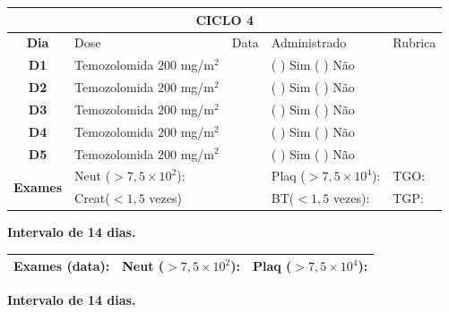 \documentclass[11pt,a4paper,oldfontcommands]{memoir}
\begin{document}
\begin{center}
\begin{longtable}{p{1cm}p{4cm}|p{1cm}|p{4.6cm}|p{3cm}}
	\hline
	\multicolumn{5}{c}{\textbf{CICLO 4}}\\
\hline
    \multicolumn{1}{c|}{\multirow{1}{*}{\textbf{Dia}}}&{Dose}&{Data}&{Administrado}&{Rubrica} \\
    \hline
    \multicolumn{1}{c|}{\multirow{1}{*}{\textbf{D1}}}&{Temozolomida \(200\) mg/m\(^2\)}&&{(  ) Sim (  ) Não}&\\
    \multicolumn{1}{c|}{\multirow{1}{*}{\textbf{D2}}}&{Temozolomida \(200\) mg/m\(^2\)}&&{(  ) Sim (  ) Não}&\\
    \multicolumn{1}{c|}{\multirow{1}{*}{\textbf{D3}}}&{Temozolomida \(200\) mg/m\(^2\)}&&{(  ) Sim (  ) Não}&\\
    \multicolumn{1}{c|}{\multirow{1}{*}{\textbf{D4}}}&{Temozolomida \(200\) mg/m\(^2\)}&&{(  ) Sim (  ) Não}&\\
    \multicolumn{1}{c|}{\multirow{1}{*}{\textbf{D5}}}&{Temozolomida \(200\) mg/m\(^2\)}&&{(  ) Sim (  ) Não}&\\
    \hline
    \multicolumn{1}{c|}{\multirow{2}{*}{\textbf{Exames}}}&\multicolumn{2}{l|}{Neut (\(>7,5\times10^2\)):}&{Plaq (\(>7,5\times10^4\)):}&{TGO:}\\
    \cline{2-5}
    \multicolumn{1}{c|}{\multirow{2}{*}{{}}}&\multicolumn{2}{l|}{Creat(\(<1,5\) vezes)}&{BT(\(<1,5\) vezes):}&{TGP:}
    \\
    \hline
\end{longtable}
\textbf{Intervalo de 14 dias.}
\begin{longtable}{p{5cm}|p{5cm}|p{4.5cm}}
    \hline
    \textbf{Exames (data):}&{Neut (\(>7,5\times10^2\)):}&{Plaq (\(>7,5\times10^4\)):}
    \\
    \hline
\end{longtable}
\textbf{Intervalo de 14 dias.}
\end{center}
\clearpage
\end{document}
